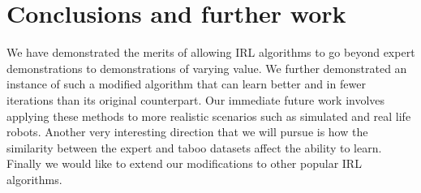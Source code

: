 \documentclass[conference]{IEEEtran}
\begin{document}
\section{Conclusions and further work}
	We have demonstrated the merits of allowing IRL algorithms to go beyond expert demonstrations to demonstrations of varying value. We further demonstrated an instance of such a modified algorithm that can learn better and in fewer iterations than its original counterpart. Our immediate future work involves applying these methods to more realistic scenarios such as simulated and real life robots. Another very interesting direction that we will pursue is how the similarity between the expert and taboo datasets affect the ability to learn. Finally we would like to extend our modifications to other popular IRL algorithms.
%
%
%
%
%
%
%
%
%  
\end{document}
